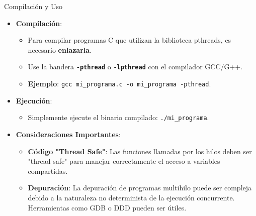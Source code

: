 \documentclass{beamer}
\begin{document}
\begin{frame}{Compilación y Uso}
    \begin{itemize}
        \item \textbf{Compilación}:
        \begin{itemize}
            \item Para compilar programas C que utilizan la biblioteca pthreads, es necesario \textbf{enlazarla}.
            \item Use la bandera \texttt{\textbf{-pthread}} o \texttt{\textbf{-lpthread}} con el compilador GCC/G++.
            \item \textbf{Ejemplo}: \texttt{gcc mi\_programa.c -o mi\_programa -pthread}.
        \end{itemize}
        \item \textbf{Ejecución}:
        \begin{itemize}
            \item Simplemente ejecute el binario compilado: \texttt{./mi\_programa}.
        \end{itemize}
        \item \textbf{Consideraciones Importantes}:
        \begin{itemize}
            \item \textbf{Código "Thread Safe"}: Las funciones llamadas por los hilos deben ser "thread safe" para manejar correctamente el acceso a variables compartidas.
            \item \textbf{Depuración}: La depuración de programas multihilo puede ser compleja debido a la naturaleza no determinista de la ejecución concurrente. Herramientas como GDB o DDD pueden ser útiles.
        \end{itemize}
    \end{itemize}
\end{frame}
\end{document}
